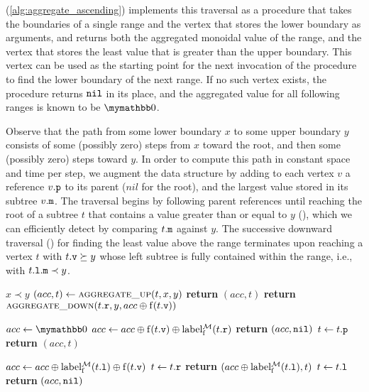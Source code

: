 \documentclass[conference]{IEEEtran}
\newcommand{\return}[0]{\textbf{return }}
\begin{document}
 (\cref{alg:aggregate_ascending}) implements this traversal as a procedure that takes the boundaries of a single range and the vertex that stores the lower boundary as arguments, and returns both the aggregated monoidal value of the range, and the vertex that stores the least value that is greater than the upper boundary. This vertex can be used as the starting point for the next invocation of the procedure to find the lower boundary of the next range. If no such vertex exists, the procedure returns $\mathtt{nil}$ in its place, and the aggregated value for all following ranges is known to be $\neutraladd$.

Observe that the path from some lower boundary $x$ to some upper boundary $y$ consists of some (possibly zero) steps from $x$ toward the root, and then some (possibly zero) steps toward $y$. In order to compute this path in constant space and time per step, we augment the data structure by adding to each vertex $v$ a reference ${v}\mathtt{.p}$ to its parent ($nil$ for the root), and the largest value stored in its subtree ${v}\mathtt{.m}$. The traversal begins by following parent references until reaching the root of a subtree $t$ that contains a value greater than or equal to $y$ (), which we can efficiently detect by comparing ${t}\mathtt{.m}$ against $y$. The successive downward traversal () for finding the least value above the range terminates upon reaching a vertex $t$ with ${t}\mathtt{.v} \succeq y$ whose left subtree is fully contained within the range, i.e., with ${{t}\mathtt{.l}}\mathtt{.m} \prec y$.

\begin{algorithm}
\caption{}\label{alg:aggregate_ascending}
\begin{algorithmic}[1]
\Require $x \prec y$
	\State $(acc, t) \gets \Call{aggregate\_up}{t, x, y}$
		\State \return $(acc, t)$
	\Else
		\State \return $\Call{aggregate\_down}{\tr{t}, y, acc \groupaddsym \f(\tv{t})}$
	\EndIf
\EndProcedure

	\State $acc \gets \neutraladd$
			\State $acc \gets acc \oplus \operatorname{f}({t}\mathtt{.v}) \oplus \operatorname{label_{\operatorname{f}}^{\mathcal{M}}}({t}\mathtt{.r})$
		\EndIf
			\State \return $(acc, \mathtt{nil})$
		\Else
			\State $t \gets {t}\mathtt{.p}$
		\EndIf
	\EndWhile
	\State \return $(acc, t)$
\EndProcedure

			\State $acc \gets acc \oplus \operatorname{label_{\operatorname{f}}^{\mathcal{M}}}({t}\mathtt{.l}) \oplus \operatorname{f}({t}\mathtt{.v})$
			\State $t \gets {t}\mathtt{.r}$
			\State \return $(acc \oplus \operatorname{label_{\operatorname{f}}^{\mathcal{M}}}({t}\mathtt{.l}), t)$
		\Else
			\State $t \gets {t}\mathtt{.l}$
		\EndIf
	\EndWhile
	\State \return $(acc, \mathtt{nil})$
\EndProcedure
\end{algorithmic}
\end{algorithm}
\end{document}
